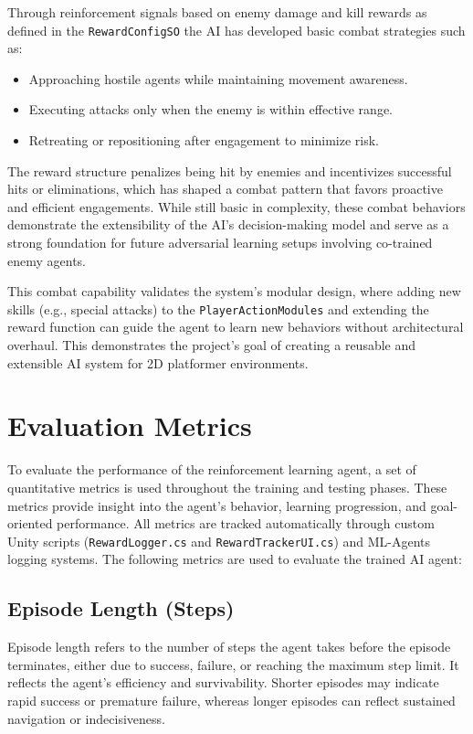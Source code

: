 \documentclass[12pt,oneside,openright,a4paper]{cpe-english-project}
\begin{document}
Through reinforcement signals based on enemy damage and kill rewards as defined in the \texttt{RewardConfigSO} the AI has developed basic combat strategies such as:

\begin{itemize}
\item Approaching hostile agents while maintaining movement awareness.
\item Executing attacks only when the enemy is within effective range.
\item Retreating or repositioning after engagement to minimize risk.
\end{itemize}

The reward structure penalizes being hit by enemies and incentivizes successful hits or eliminations, which has shaped a combat pattern that favors proactive and efficient engagements. While still basic in complexity, these combat behaviors demonstrate the extensibility of the AI’s decision-making model and serve as a strong foundation for future adversarial learning setups involving co-trained enemy agents.


This combat capability validates the system's modular design, where adding new skills (e.g., special attacks) to the \texttt{PlayerActionModules} and extending the reward function can guide the agent to learn new behaviors without architectural overhaul. This demonstrates the project's goal of creating a reusable and extensible AI system for 2D platformer environments.

\section{Evaluation Metrics}
To evaluate the performance of the reinforcement learning agent, a set of quantitative metrics is used throughout the training and testing phases. These metrics provide insight into the agent’s behavior, learning progression, and goal-oriented performance. All metrics are tracked automatically through custom Unity scripts (\texttt{RewardLogger.cs} and \texttt{RewardTrackerUI.cs}) and ML-Agents logging systems.
The following metrics are used to evaluate the trained AI agent:

\subsection{Episode Length (Steps)}
Episode length refers to the number of steps the agent takes before the episode terminates, either due to success, failure, or reaching the maximum step limit. It reflects the agent's efficiency and survivability. Shorter episodes may indicate rapid success or premature failure, whereas longer episodes can reflect sustained navigation or indecisiveness.
\end{document}
